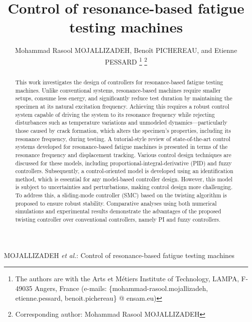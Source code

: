 \documentclass[lettersize,journal]{IEEEtran}
\begin{document}
\title{Control of resonance-based fatigue testing  machines}

\author{Mohammad Rasool MOJALLIZADEH, Benoît PICHEREAU, and Etienne PESSARD
\thanks{The authors are with the Arts et Métiers Institute of Technology, LAMPA, F-49035 Angers, France (e-mails: \{mohammad-rasool.mojallizadeh, etienne.pessard, benoit.pichereau\} @ ensam.eu)}
\thanks{Corresponding author: Mohammad Rasool MOJALLIZADEH}
}

%
{MOJALLIZADEH \MakeLowercase{\textit{et al.}}: Control of resonance-based fatigue testing machines}


\maketitle

\begin{abstract}
This work investigates the design of controllers for resonance-based fatigue testing machines. Unlike conventional systems, resonance-based machines require smaller setups, consume less energy, and significantly reduce test duration by maintaining the specimen at its natural excitation frequency. Achieving this requires a robust control system capable of driving the system to its resonance frequency while rejecting disturbances such as temperature variations and unmodeled dynamics—particularly those caused by crack formation, which alters the specimen’s properties, including its resonance frequency, during testing. A tutorial-style review of state-of-the-art control systems developed for resonance-based fatigue machines is presented in terms of the resonance frequency and displacement tracking. Various control design techniques are discussed for these models, including proportional-integral-derivative (PID) and fuzzy controllers. Subsequently, a control-oriented model is developed using an identification method, which is essential for any model-based controller design. However, this model is subject to uncertainties and perturbations, making control design more challenging. To address this, a sliding-mode controller (SMC) based on the twisting algorithm is proposed to ensure robust stability. Comparative analyses using both numerical simulations and experimental results demonstrate the advantages of the proposed twisting controller over conventional controllers, namely PI and fuzzy controllers.
\end{abstract}
\end{document}
